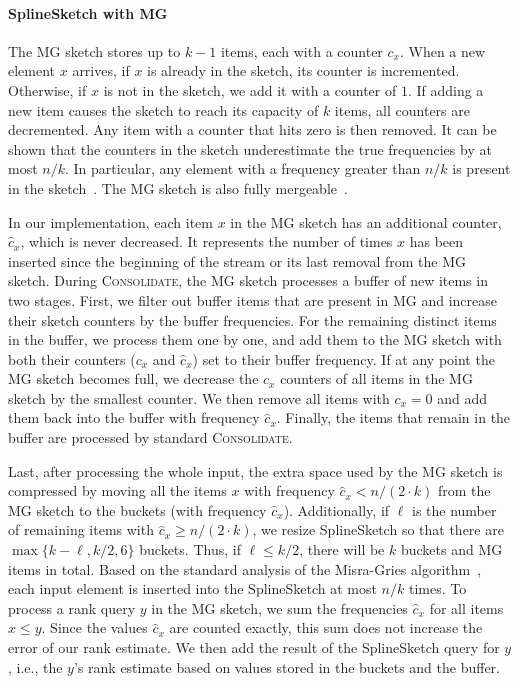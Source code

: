 \documentclass[acmsmall]{acmart}
\newcommand{\consolidate}{\textsc{Consolidate}\xspace}
\theoremstyle{remark}
\begin{document}
\vspace{-0.2cm}

\paragraph{SplineSketch with MG}

The MG sketch stores up to $k-1$ items, each with a counter $c_x$. 
When a new element $x$ arrives,
if $x$ is already in the sketch, its counter is incremented.
Otherwise, if $x$ is not in the sketch, we add it with a counter of $1$.
If adding a new item causes the sketch to reach its capacity of $k$ items, all counters are decremented.
Any item with a counter that hits zero is then removed.
It can be shown that the counters in the sketch underestimate the true frequencies by at most $n/k$.
In particular, any element with a frequency greater than $n/k$ is present in the sketch~\cite{misra1982finding}.
The MG sketch is also fully mergeable~\cite{AgarwalCHPWY13}.

In our implementation, each item $x$ in the MG sketch has an additional counter, $\hat{c}_x$, which is never decreased.
It represents the number of times $x$ has been inserted since the beginning of the stream or its last removal from the MG sketch.
During \consolidate, the MG sketch processes a buffer of new items in two stages.
First, we filter out buffer items that are present in MG and increase their sketch counters by the buffer frequencies.
For the remaining distinct items in the buffer, we process them one by one, and add them to the MG sketch with both their counters ($c_x$ and $\hat{c}_x$) set to their buffer frequency.
If at any point the MG sketch becomes full, we decrease the $c_x$ counters of all items in the MG sketch by the smallest counter.
We then remove all items with $c_x = 0$ and add them back into the buffer with frequency $\hat{c}_x$.
Finally, the items that remain in the buffer are processed by standard \consolidate.

Last, after processing the whole input, the extra space used by the MG sketch is compressed by moving all the items $x$ with frequency $\hat{c}_x < n/(2\cdot k)$
from the MG sketch to the buckets (with frequency $\hat{c}_x$). 
Additionally, if $\ell$ is the number of remaining items with $\hat{c}_x \ge n/(2\cdot k)$,
we resize SplineSketch so that there are $\max\{k - \ell, k / 2, 6\}$ buckets.
Thus, if $\ell \le k/2$, there will be $k$ buckets and MG items in total.
Based on the standard analysis of the Misra-Gries algorithm~\cite{misra1982finding}, each input element is inserted into the SplineSketch at most $n/k$ times.
To process a rank query $y$ in the MG sketch, we sum the frequencies $\hat{c}_x$ for all items $x \leq y$.
Since the values $\hat{c}_x$ are counted exactly, this sum does not increase the error of our rank estimate.
We then add the result of the SplineSketch query for $y$, i.e., the $y$'s rank estimate based on values stored in the buckets and the buffer.
\end{document}
